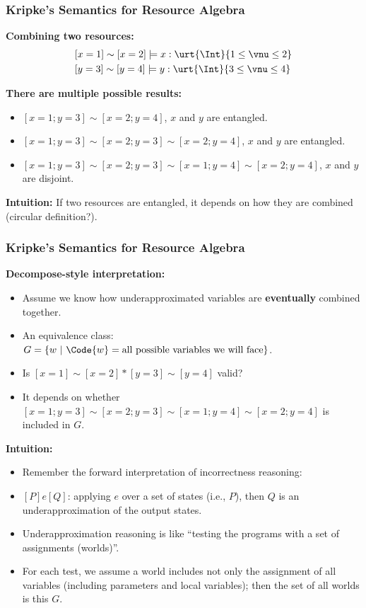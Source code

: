\begin{frame}[fragile]
    \frametitle{Kripke's Semantics for Resource Algebra}

\textbf{Combining two resources:}
\begin{align*}
    &[x=1] \sim [x=2] \models x : \urt{\Int}{1 \leq \vnu \leq 2}
    \\&[y=3] \sim [y=4] \models y : \urt{\Int}{3 \leq \vnu \leq 4}
\end{align*}\noindent

\textbf{There are multiple possible results:}
\begin{itemize}
    \item $[x=1;y=3] \sim [x=2;y=4]$, $x$ and $y$ are entangled.
    \item $[x=1;y=3] \sim [x=2;y=3] \sim [x=2;y=4]$, $x$ and $y$ are entangled.
    \item $[x=1;y=3] \sim [x=2;y=3] \sim [x=1;y=4] \sim [x=2;y=4]$, $x$ and $y$ are disjoint.
\end{itemize}

\textbf{Intuition:} If two resources are entangled, it depends on how they are combined (circular definition?).

\end{frame}

\begin{frame}[fragile]
    \frametitle{Kripke's Semantics for Resource Algebra}

\textbf{Decompose-style interpretation:}
\begin{itemize}
    \item Assume we know how underapproximated variables are \textbf{eventually} combined together.
    \item An equivalence class: $G = \{ w ~|~ \Code{w} = \text{all possible variables we will face}\}$.
    \item Is $[x=1] \sim [x=2] * [y=3] \sim [y=4]$ valid?
    \item It depends on whether $[x=1;y=3] \sim [x=2;y=3] \sim [x=1;y=4] \sim [x=2;y=4]$ is included in $G$.
\end{itemize}

\textbf{Intuition:}
\begin{itemize}
    \item Remember the forward interpretation of incorrectness reasoning:
    \item $[P]e[Q]$: applying $e$ over a set of states (i.e., $P$), then $Q$ is an underapproximation of the output states.
    \item Underapproximation reasoning is like ``testing the programs with a set of assignments (worlds)''.
    \item For each test, we assume a world includes not only the assignment of all variables (including parameters and local variables); then the set of all worlds is this $G$.
\end{itemize}

\end{frame}

